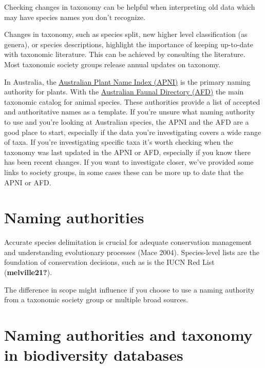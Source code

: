\documentclass[
  letterpaper,
  DIV=11,
  numbers=noendperiod,
  oneside]{scrreprt}
\begin{document}
Checking changes in taxonomy can be helpful when interpreting old data
which may have species names you don't recognize.

Changes in taxonomy, such as species split, new higher level
classification (as genera), or species descriptions, highlight the
importance of keeping up-to-date with taxonomic literature. This can be
achieved by consulting the literature. Most taxonomic society groups
release annual updates on taxonomy.

In Australia, the \href{https://www.anbg.gov.au/apni/}{Australian Plant
Name Index (APNI)} is the primary naming authority for plants. With the
\href{https://biodiversity.org.au/afd/home}{Australian Faunal Directory
(AFD)} the main taxonomic catalog for animal species. These authorities
provide a list of accepted and authoritative names as a template. If
you're unsure what naming authority to use and you're looking at
Australian species, the APNI and the AFD are a good place to start,
especially if the data you're investigating covers a wide range of taxa.
If you're investigating specific taxa it's worth checking when the
taxonomy was last updated in the APNI or AFD, especially if you know
there has been recent changes. If you want to investigate closer, we've
provided some links to society groups, in some cases these can be more
up to date that the APNI or AFD.

\hypertarget{naming-authorities-1}{%
\section{Naming authorities}\label{naming-authorities-1}}

Accurate species delimitation is crucial for adequate conservation
management and understanding evolutionary processes (Mace 2004).
Species-level lists are the foundation of conservation decisions, such
as is the IUCN Red List (\textbf{melville21?}).

The difference in scope might influence if you choose to use a naming
authority from a taxonomic society group or multiple broad sources.

\hypertarget{naming-authorities-and-taxonomy-in-biodiversity-databases}{%
\section{Naming authorities and taxonomy in biodiversity
databases}\label{naming-authorities-and-taxonomy-in-biodiversity-databases}}
\end{document}

